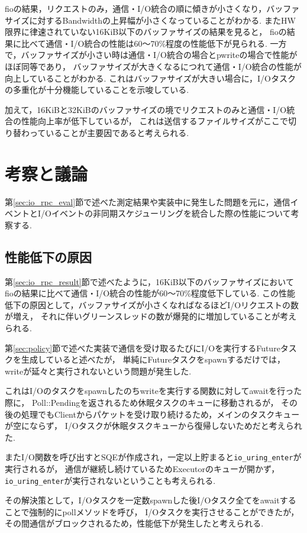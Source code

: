 \documentclass[a4paper,11pt]{jreport}
\begin{document}
fioの結果，リクエストのみ，通信・I/O統合の順に傾きが小さくなり，バッファサイズに対するBandwidthの上昇幅が小さくなっていることがわかる.
またHW限界に律速されていない16KiB以下のバッファサイズの結果を見ると，
fioの結果に比べて通信・I/O統合の性能は60〜70\%程度の性能低下が見られる.
一方で，バッファサイズが小さい時は通信・I/O統合の場合とpwriteの場合で性能がほぼ同等であり，
バッファサイズが大きくなるにつれて通信・I/O統合の性能が向上していることがわかる.
これはバッファサイズが大きい場合に，I/Oタスクの多重化が十分機能していることを示唆している.

加えて，16KiBと32KiBのバッファサイズの境でリクエストのみと通信・I/O統合の性能向上率が低下しているが，
これは送信するファイルサイズがここで切り替わっていることが主要因であると考えられる.

\section{考察と議論}\label{sec:discussion}
第\ref{sec:io_rpc_eval}節で述べた測定結果や実装中に発生した問題を元に，通信イベントとI/Oイベントの非同期スケジューリングを統合した際の性能について考察する.

\subsection{性能低下の原因}\label{sec:io_rpc_cause}
第\ref{sec:io_rpc_result}節で述べたように，16KiB以下のバッファサイズにおいて
fioの結果に比べて通信・I/O統合の性能が60〜70\%程度低下している.
この性能低下の原因として，バッファサイズが小さくなればなるほどI/Oリクエストの数が増え，
それに伴いグリーンスレッドの数が爆発的に増加していることが考えられる.

第\ref{sec:policy}節で述べた実装で通信を受け取るたびにI/Oを実行するFutureタスクを生成していると述べたが，
単純にFutureタスクをspawnするだけでは，writeが延々と実行されないという問題が発生した.

これはI/Oのタスクをspawnしたのちwriteを実行する関数に対してawaitを行った際に，
Poll::Pendingを返されるため休眠タスクのキューに移動されるが，
その後の処理でもClientからパケットを受け取り続けるため，メインのタスクキューが空にならず，
I/Oタスクが休眠タスクキューから復帰しないためだと考えられた.

またI/O関数を呼び出すとSQEが作成され，一定以上貯まると\lstinline|io_uring_enter|が実行されるが，
通信が継続し続けているためExecutorのキューが開かず，\lstinline|io_uring_enter|が実行されないということも考えられる.

その解決策として，I/Oタスクを一定数spawnした後I/Oタスク全てをawaitすることで強制的にpollメソッドを呼び，
I/Oタスクを実行させることができたが，その間通信がブロックされるため，性能低下が発生したと考えられる.
\end{document}
